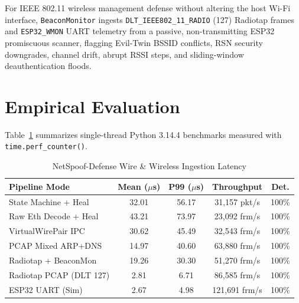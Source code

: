 \documentclass[conference]{IEEEtran}
\begin{document}
For IEEE 802.11 wireless management defense without altering the host Wi-Fi interface, \texttt{BeaconMonitor} ingests \texttt{DLT\_IEEE802\_11\_RADIO} (127) Radiotap frames and \texttt{ESP32\_WMON} UART telemetry from a passive, non-transmitting ESP32 promiscuous scanner, flagging Evil-Twin BSSID conflicts, RSN security downgrades, channel drift, abrupt RSSI steps, and sliding-window deauthentication floods.

\section{Empirical Evaluation}
Table~\ref{tab:eval} summarizes single-thread Python 3.14.4 benchmarks measured with \texttt{time.perf\_counter()}.

\begin{table}[htbp]
\caption{NetSpoof-Defense Wire \& Wireless Ingestion Latency}
\begin{center}
\begin{tabular}{lcccc}
\toprule
\textbf{Pipeline Mode} & \textbf{Mean ($\mu$s)} & \textbf{P99 ($\mu$s)} & \textbf{Throughput} & \textbf{Det.} \\
\midrule
State Machine + Heal & 32.01 & 56.17 & 31,157 pkt/s & 100\% \\
Raw Eth Decode + Heal & 43.21 & 73.97 & 23,092 frm/s & 100\% \\
VirtualWirePair IPC & 30.62 & 45.49 & 32,543 frm/s & 100\% \\
PCAP Mixed ARP+DNS & 14.97 & 40.60 & 63,880 frm/s & 100\% \\
Radiotap + BeaconMon & 19.26 & 30.30 & 51,270 frm/s & 100\% \\
Radiotap PCAP (DLT 127) & 2.81 & 6.71 & 86,585 frm/s & 100\% \\
ESP32 UART (Sim) & 2.67 & 4.98 & 121,691 frm/s & 100\% \\
\bottomrule
\end{tabular}
\label{tab:eval}
\end{center}
\end{table}



\end{document}
